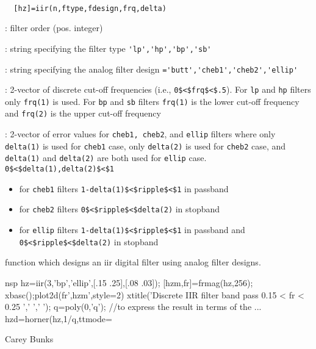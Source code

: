 \begin{mandesc}
   \\ %
\end{mandesc}
\begin{calling_sequence}
\begin{verbatim}
  [hz]=iir(n,ftype,fdesign,frq,delta)  
\end{verbatim}
\end{calling_sequence}
\begin{parameters}
  \begin{varlist}
    : filter order (pos. integer)

    : string specifying the filter type \verb!'lp','hp','bp','sb'!

    : string specifying the analog filter design
    \verb!='butt','cheb1','cheb2','ellip'!

    : 2-vector of discrete cut-off frequencies (i.e.,
    \verb!0$<$frq$<$.5!). For \verb!lp! and \verb!hp! filters only \verb!frq(1)!
    is used. For \verb!bp! and \verb!sb! filters \verb!frq(1)! is the lower
    cut-off frequency and \verb!frq(2)! is the upper cut-off frequency

    : 2-vector of error values for \verb!cheb1, cheb2!, and
    \verb!ellip! filters where only \verb!delta(1)! is used for \verb!cheb1!
    case, only \verb!delta(2)! is used for \verb!cheb2! case, and
    \verb!delta(1)! and \verb!delta(2)! are both used for \verb!ellip!
    case. \verb!0$<$delta(1),delta(2)$<$1!
    \begin{itemize}
    \item for \verb!cheb1! filters \verb!1-delta(1)$<$ripple$<$1! in passband
    \item for \verb!cheb2! filters \verb!0$<$ripple$<$delta(2)! in stopband
    \item for \verb!ellip! filters \verb!1-delta(1)$<$ripple$<$1! in passband
      and \verb!0$<$ripple$<$delta(2)! in stopband \end{itemize}
  \end{varlist}
\end{parameters}
\begin{mandescription}
  function which designs an iir digital filter using analog filter designs.
\end{mandescription}
\begin{examples}
  \begin{mintednsp}{nsp}
    hz=iir(3,'bp','ellip',[.15 .25],[.08 .03]);
    [hzm,fr]=frmag(hz,256);
    xbasc();plot2d(fr',hzm',style=2)
    xtitle('Discrete IIR filter band pass  0.15 < fr < 0.25 ',' ',' ');
    q=poly(0,'q');     //to express the result in terms of the ...
    hzd=horner(hz,1/q,ttmode=%
  \end{mintednsp}
\end{examples}
\begin{manseealso}
     
\end{manseealso}
\begin{authors}
    Carey Bunks  
\end{authors}

